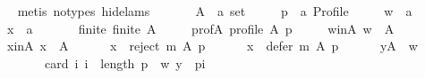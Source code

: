 \begin{isabellebody}
\ \ \ \ \isamarkupfalse%
\ {\isacharparenleft}{\kern0pt}metis\ {\isacharparenleft}{\kern0pt}no{\isacharunderscore}{\kern0pt}types{\isacharcomma}{\kern0pt}\ hide{\isacharunderscore}{\kern0pt}lams{\isacharparenright}{\kern0pt}{\isacharparenright}{\kern0pt}\isanewline
{}\isamarkupfalse%
\isanewline
\ \ \isamarkupfalse%
\isanewline
\ \ \ \ A\ {\isacharcolon}{\kern0pt}{\isacharcolon}{\kern0pt}\ {\isachardoublequoteopen}{\isacharprime}{\kern0pt}a\ set{\isachardoublequoteclose}\ \isanewline
\ \ \ \ p\ {\isacharcolon}{\kern0pt}{\isacharcolon}{\kern0pt}\ {\isachardoublequoteopen}{\isacharprime}{\kern0pt}a\ Profile{\isachardoublequoteclose}\ \isanewline
\ \ \ \ w\ {\isacharcolon}{\kern0pt}{\isacharcolon}{\kern0pt}\ {\isachardoublequoteopen}{\isacharprime}{\kern0pt}a{\isachardoublequoteclose}\ \isanewline
\ \ \ \ x\ {\isacharcolon}{\kern0pt}{\isacharcolon}{\kern0pt}\ {\isachardoublequoteopen}{\isacharprime}{\kern0pt}a{\isachardoublequoteclose}\isanewline
\ \ \isamarkupfalse%
\isanewline
\ \ \ \ finite{\isacharcolon}{\kern0pt}\ {\isachardoublequoteopen}finite\ A{\isachardoublequoteclose}\ \isanewline
\ \ \ \ prof{\isacharunderscore}{\kern0pt}A{\isacharcolon}{\kern0pt}\ {\isachardoublequoteopen}profile\ A\ p{\isachardoublequoteclose}\ \isanewline
\ \ \ \ w{\isacharunderscore}{\kern0pt}in{\isacharunderscore}{\kern0pt}A{\isacharcolon}{\kern0pt}\ {\isachardoublequoteopen}w\ {\isasymin}\ A{\isachardoublequoteclose}\ \isanewline
\ \ \ \ x{\isacharunderscore}{\kern0pt}in{\isacharunderscore}{\kern0pt}A{\isacharcolon}{\kern0pt}\ {\isachardoublequoteopen}x\ {\isasymin}\ A{\isachardoublequoteclose}\ \isanewline
\ \ \ \ {}{\isacharcolon}{\kern0pt}\ {\isachardoublequoteopen}x\ {\isasymnotin}\ reject\ m\ A\ p{\isachardoublequoteclose}\ \isanewline
\ \ \ \ {}{\isacharcolon}{\kern0pt}\ {\isachardoublequoteopen}x\ {\isasymnotin}\ defer\ m\ A\ p{\isachardoublequoteclose}\ \isanewline
\ \ \ \ {}{\isacharcolon}{\kern0pt}\ {\isachardoublequoteopen}{\isasymforall}y{\isasymin}A\ {\isacharminus}{\kern0pt}\ {\isacharbraceleft}{\kern0pt}w{\isacharbraceright}{\kern0pt}{\isachardot}{\kern0pt}\isanewline
\ \ \ \ \ \ \ \ \ \ card\ {\isacharbraceleft}{\kern0pt}i{\isachardot}{\kern0pt}\ i\ {\isacharless}{\kern0pt}\ length\ p\ {\isasymand}\ {\isacharparenleft}{\kern0pt}w{\isacharcomma}{\kern0pt}\ y{\isacharparenright}{\kern0pt}\ {\isasymin}\ {\isacharparenleft}{\kern0pt}p{\isacharbang}{\kern0pt}i{\isacharparenright}{\kern0pt}{\isacharbraceright}{\kern0pt}\ {\isacharless}{\kern0pt}\isanewline

\end{isabellebody}

